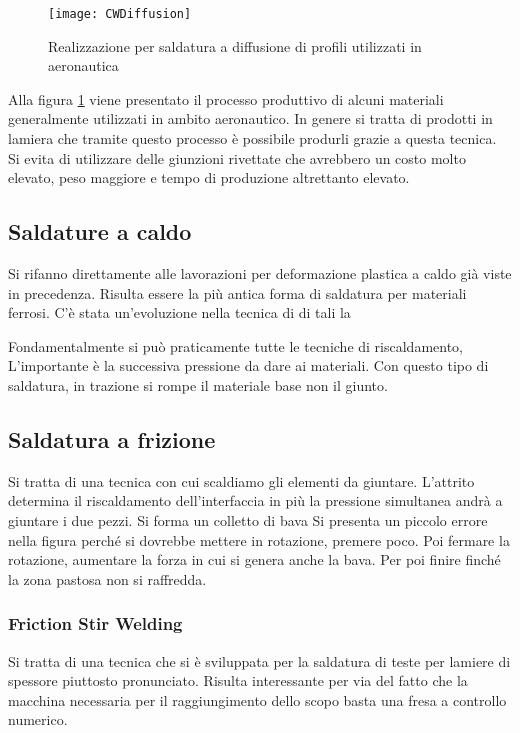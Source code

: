 \begin{figure}
\centering
\texttt{[image: CWDiffusion]}
\caption{Realizzazione per saldatura a diffusione di profili utilizzati in aeronautica}
\label{fig:CWDIffusion}
\end{figure}

Alla figura \ref{fig:CWDIffusion} viene presentato il processo produttivo di alcuni materiali generalmente utilizzati in ambito aeronautico. In genere si tratta di prodotti in lamiera che tramite questo processo è possibile produrli grazie a questa tecnica.
Si evita di utilizzare delle giunzioni rivettate che avrebbero un costo molto elevato, peso maggiore e tempo di produzione altrettanto elevato.

\subsection{Saldature a caldo}
Si rifanno direttamente alle lavorazioni per deformazione plastica a caldo già viste in precedenza.
Risulta essere la più antica forma di saldatura per materiali ferrosi.
C'è stata un'evoluzione nella tecnica di di tali la\todo{\\Aggiungi}

Fondamentalmente si può praticamente tutte le tecniche di riscaldamento, L'importante è la successiva pressione da dare ai materiali.
Con questo tipo di saldatura, in trazione si rompe il materiale base non il giunto.

\subsection{Saldatura a frizione}
Si tratta di una tecnica con cui scaldiamo gli elementi da giuntare.
L'attrito determina il riscaldamento dell'interfaccia in più la pressione simultanea andrà a giuntare i due pezzi. Si forma un colletto di bava
Si presenta un piccolo errore nella figura perché si dovrebbe mettere in rotazione, premere poco.
Poi fermare la rotazione, aumentare la forza in cui si genera anche la bava. 
Per poi finire finché la zona pastosa non si raffredda.

\subsubsection{Friction Stir Welding}
Si tratta di una tecnica che si è sviluppata per la saldatura di teste per lamiere di spessore piuttosto pronunciato. 
Risulta interessante per via del fatto che la macchina necessaria per il raggiungimento dello scopo basta una fresa a controllo numerico.


